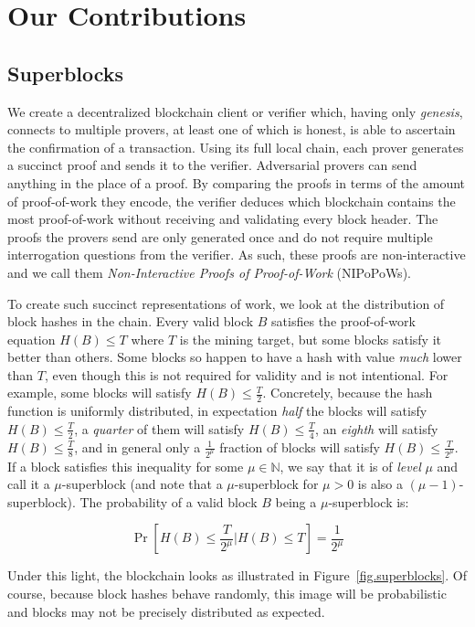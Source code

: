\section{Our Contributions}
\subsection{Superblocks}

We create a decentralized blockchain client or verifier which, having only
\emph{genesis}, connects to multiple provers, at least one of which is honest,
is able to ascertain the confirmation of a transaction. Using its full local
chain, each prover generates a succinct proof and sends it to the verifier.
Adversarial provers can send anything in the place of a proof. By comparing the
proofs in terms of the amount of proof-of-work they encode, the verifier deduces
which blockchain contains the most proof-of-work without receiving and
validating every block header. The proofs the provers send are only generated
once and do not require multiple interrogation questions from the verifier. As
such, these proofs are non-interactive and we call them \emph{Non-Interactive
Proofs of Proof-of-Work} (NIPoPoWs).

To create such succinct representations of work, we look at the distribution of
block hashes in the chain. Every valid block $B$ satisfies the proof-of-work
equation $H(B) \leq T$ where $T$ is the mining target, but some blocks satisfy
it better than others. Some blocks so happen to have a hash with value
\emph{much} lower than $T$, even though this is not required for validity and is
not intentional. For example, some blocks will satisfy $H(B) \leq \frac{T}{2}$.
Concretely, because the hash function is uniformly distributed, in expectation
\emph{half} the blocks will satisfy $H(B) \leq \frac{T}{2}$, a \emph{quarter} of
them will satisfy $H(B) \leq \frac{T}{4}$, an \emph{eighth} will satisfy $H(B)
\leq \frac{T}{8}$, and in general only a $\frac{1}{2^\mu}$ fraction of blocks
will satisfy $H(B) \leq \frac{T}{2^\mu}$. If a block satisfies this inequality
for some $\mu \in \mathbb{N}$, we say that it is of \emph{level} $\mu$ and call
it a $\mu$-superblock (and note that a $\mu$-superblock for $\mu > 0$ is also
a $(\mu - 1)$-superblock). The probability of a valid block $B$ being a
$\mu$-superblock is:

\[
\Pr[H(B) \leq \frac{T}{2^\mu}|H(B) \leq T] = \frac{1}{2^\mu}
\]

Under this light, the blockchain looks as illustrated in
Figure~\ref{fig.superblocks}. Of course, because block hashes behave randomly,
this image will be probabilistic and blocks may not be precisely distributed as
expected.

